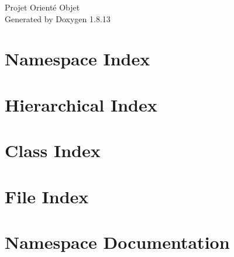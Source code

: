 \documentclass[twoside]{book}
\newcommand{\+}{\discretionary{\mbox{\scriptsize$\hookleftarrow$}}{}{}}
\newcommand{\clearemptydoublepage}{%
  \newpage{\pagestyle{empty}\cleardoublepage}%
}
\begin{document}
\hypersetup{pageanchor=false,
             bookmarksnumbered=true,
             pdfencoding=unicode
            }
\begin{titlepage}
\vspace*{7cm}
\begin{center}%
{\Large Projet Orienté Objet }\\
\vspace*{1cm}
{\large Generated by Doxygen 1.8.13}\\
\end{center}
\end{titlepage}
\clearemptydoublepage
{}
\tableofcontents
\clearemptydoublepage
{}
\hypersetup{pageanchor=true}

\chapter{Namespace Index}

\chapter{Hierarchical Index}

\chapter{Class Index}

\chapter{File Index}

\chapter{Namespace Documentation}













\end{document}
